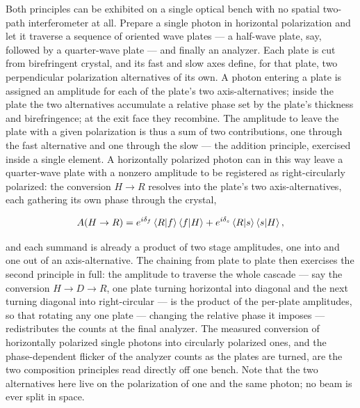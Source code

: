 Both principles can be exhibited on a single optical bench with no spatial two-path interferometer at all. Prepare a single photon in horizontal polarization and let it traverse a sequence of oriented wave plates --- a half-wave plate, say, followed by a quarter-wave plate --- and finally an analyzer. Each plate is cut from birefringent crystal, and its fast and slow axes define, for that plate, two perpendicular polarization alternatives of its own. A photon entering a plate is assigned an amplitude for each of the plate's two axis-alternatives; inside the plate the two alternatives accumulate a relative phase set by the plate's thickness and birefringence; at the exit face they recombine. The amplitude to leave the plate with a given polarization is thus a sum of two contributions, one through the fast alternative and one through the slow --- the addition principle, exercised inside a single element. A horizontally polarized photon can in this way leave a quarter-wave plate with a nonzero amplitude to be registered as right-circularly polarized: the conversion $H \to R$ resolves into the plate's two axis-alternatives, each gathering its own phase through the crystal,
\begin{linenomath}
\begin{equation}
    A(H \to R) = e^{i\delta_f}\braket{R|f}\braket{f|H} + e^{i\delta_s}\braket{R|s}\braket{s|H} ,
\end{equation}
\end{linenomath}
and each summand is already a product of two stage amplitudes, one into and one out of an axis-alternative. The chaining from plate to plate then exercises the second principle in full: the amplitude to traverse the whole cascade --- say the conversion $H \to D \to R$, one plate turning horizontal into diagonal and the next turning diagonal into right-circular --- is the product of the per-plate amplitudes, so that rotating any one plate --- changing the relative phase it imposes --- redistributes the counts at the final analyzer. The measured conversion of horizontally polarized single photons into circularly polarized ones, and the phase-dependent flicker of the analyzer counts as the plates are turned, are the two composition principles read directly off one bench. Note that the two alternatives here live on the polarization of one and the same photon; no beam is ever split in space.

